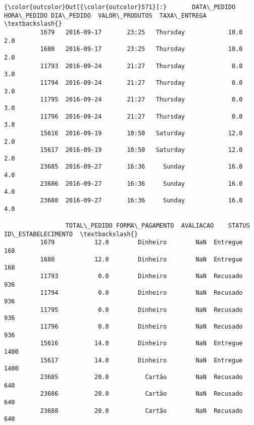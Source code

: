 \documentclass[11pt]{article}
\begin{document}
\begin{Verbatim}[commandchars=\\\{\}]
{\color{outcolor}Out[{\color{outcolor}571}]:}       DATA\_PEDIDO HORA\_PEDIDO DIA\_PEDIDO  VALOR\_PRODUTOS  TAXA\_ENTREGA  \textbackslash{}
          1679   2016-09-17       23:25   Thursday            10.0           2.0   
          1680   2016-09-17       23:25   Thursday            10.0           2.0   
          11793  2016-09-24       21:27   Thursday             0.0           3.0   
          11794  2016-09-24       21:27   Thursday             0.0           3.0   
          11795  2016-09-24       21:27   Thursday             0.0           3.0   
          11796  2016-09-24       21:27   Thursday             0.0           3.0   
          15616  2016-09-19       10:50   Saturday            12.0           2.0   
          15617  2016-09-19       10:50   Saturday            12.0           2.0   
          23685  2016-09-27       16:36     Sunday            16.0           4.0   
          23686  2016-09-27       16:36     Sunday            16.0           4.0   
          23688  2016-09-27       16:36     Sunday            16.0           4.0   
          
                 TOTAL\_PEDIDO FORMA\_PAGAMENTO  AVALIACAO    STATUS  ID\_ESTABELECIMENTO  \textbackslash{}
          1679           12.0        Dinheiro        NaN  Entregue                 168   
          1680           12.0        Dinheiro        NaN  Entregue                 168   
          11793           0.0        Dinheiro        NaN  Recusado                 936   
          11794           0.0        Dinheiro        NaN  Recusado                 936   
          11795           0.0        Dinheiro        NaN  Recusado                 936   
          11796           0.0        Dinheiro        NaN  Recusado                 936   
          15616          14.0        Dinheiro        NaN  Entregue                1400   
          15617          14.0        Dinheiro        NaN  Entregue                1400   
          23685          20.0          Cartão        NaN  Recusado                 640   
          23686          20.0          Cartão        NaN  Recusado                 640   
          23688          20.0          Cartão        NaN  Recusado                 640   
          

\end{Verbatim}
\end{document}
